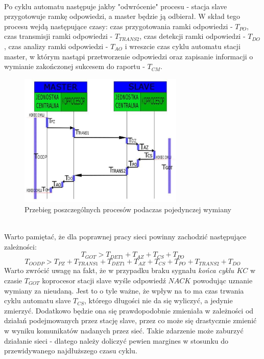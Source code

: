 	\\Po cyklu automatu następuje jakby "odwrócenie" procesu - stacja slave przygotowuje ramkę odpowiedzi, a master będzie ją odbierał. W skład tego procesu wejdą następujące czasy: czas przygotowania ramki odpowiedzi - $ T_{PO} $, czas transmisji ramki odpowiedzi - $ T_{TRANS2} $, czas detekcji ramki odpowiedzi - $ T_{DO} $, czas analizy ramki odpowiedzi - $ T_{AO} $ i wreszcie czas cyklu automatu stacji master, w którym nastąpi przetworzenie odpowiedzi oraz zapisanie informacji o wymianie zakończonej sukcesem do raportu - $ T_{CM} $.\\
	\begin{figure}[h]
		\centering
		\includegraphics[width=0.7\textwidth]{./img/wymiana.jpg}
		\caption{Przebieg poszczególnych procesów podaczas pojedynczej wymiany}
		\label{fig:wymiana}
	\end{figure}
	\\
	Warto pamiętać, że dla poprawnej pracy sieci powinny zachodzić następujące zależności:
	\begin{equation}
		\label{eq:zalTgot}
		T_{GOT} > T_{DET1} + T_{AZ} + T_{CS} + T_{PO}
	\end{equation}
	\begin{equation}
		\label{eq:zalToodp}
		T_{OODP} > T_{PZ} + T_{TRANS1} + T_{DET1} + T_{AZ} + T_{CS} + T_{PO} + T_{TRANS2} + T_{DO}
	\end{equation}
	Warto zwrócić uwagę na fakt, że w przypadku braku sygnału \textit{końca cyklu $ KC $} w czasie $ T_{GOT} $ koprocesor stacji slave wyśle odpowiedź $ NACK $ powodując uznanie wymiany za nieudaną. Jest to o tyle ważne, że wpływ na to ma czas trwania cyklu automatu slave $ T_{CS} $, którego długości nie da się wyliczyć, a jedynie zmierzyć. Dodatkowo będzie ona się prawdopodobnie zmieniała w zależności od działań podejmowanych przez stację slave, przez co może się drastycznie zmienić w wyniku komunikatów nadanych przez sieć. Takie zdarzenie może zaburzyć działanie sieci - dlatego należy doliczyć pewien margines w stosunku do przewidywanego najdłuższego czasu cyklu.
